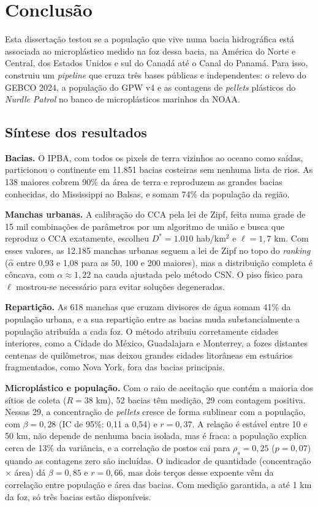\chapter{Conclusão}
\label{chap:conclusao}

Esta dissertação testou se a população que vive numa bacia hidrográfica está associada ao microplástico medido na foz dessa bacia, na América do Norte e Central, dos Estados Unidos e sul do Canadá até o Canal do Panamá. Para isso, construiu um \textit{pipeline} que cruza três bases públicas e independentes: o relevo do GEBCO 2024, a população do GPW v4 e as contagens de \textit{pellets} plásticos do \textit{Nurdle Patrol} no banco de microplásticos marinhos da NOAA.

\section{Síntese dos resultados}

\textbf{Bacias.} O IPBA, com todos os pixels de terra vizinhos ao oceano como saídas, particionou o continente em 11.851 bacias costeiras sem nenhuma lista de rios. As 138 maiores cobrem 90\% da área de terra e reproduzem as grandes bacias conhecidas, do Mississippi ao Balsas, e somam 74\% da população da região.

\textbf{Manchas urbanas.} A calibração do CCA pela lei de Zipf, feita numa grade de 15 mil combinações de parâmetros por um algoritmo de união e busca que reproduz o CCA exatamente, escolheu $D^{*} = 1.010$ hab/km$^2$ e $\ell = 1{,}7$ km. Com esses valores, as 12.185 manchas urbanas seguem a lei de Zipf no topo do \textit{ranking} ($\hat{\alpha}$ entre 0,93 e 1,08 para as 50, 100 e 200 maiores), mas a distribuição completa é côncava, com $\alpha \approx 1{,}22$ na cauda ajustada pelo método CSN. O piso físico para $\ell$ mostrou-se necessário para evitar soluções degeneradas.

\textbf{Repartição.} As 618 manchas que cruzam divisores de água somam 41\% da população urbana, e a sua repartição entre as bacias muda substancialmente a população atribuída a cada foz. O método atribuiu corretamente cidades interiores, como a Cidade do México, Guadalajara e Monterrey, a fozes distantes centenas de quilômetros, mas deixou grandes cidades litorâneas em estuários fragmentados, como Nova York, fora das bacias principais.

\textbf{Microplástico e população.} Com o raio de aceitação que contém a maioria dos sítios de coleta ($R = 38$ km), 52 bacias têm medição, 29 com contagem positiva. Nessas 29, a concentração de \textit{pellets} cresce de forma sublinear com a população, com $\beta = 0{,}28$ (IC de 95\%: 0,11 a 0,54) e $r = 0{,}37$. A relação é estável entre 10 e 50 km, não depende de nenhuma bacia isolada, mas é fraca: a população explica cerca de 13\% da variância, e a correlação de postos cai para $\rho_s = 0{,}25$ ($p = 0{,}07$) quando as contagens zero são incluídas. O indicador de quantidade (concentração $\times$ área) dá $\beta = 0{,}85$ e $r = 0{,}66$, mas dois terços desse expoente vêm da correlação entre população e área das bacias. Com medição garantida, a até 1 km da foz, só três bacias estão disponíveis.


